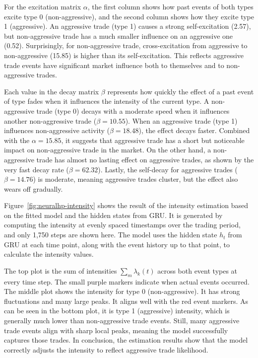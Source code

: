 For the excitation matrix $\alpha$, the first column shows how past events of both types excite type 0 (non-aggressive), and the second column shows how they excite type 1 (aggressive). An aggressive trade (type 1) causes a strong self-excitation (2.57), but non-aggressive trade has a much smaller influence on an aggressive one (0.52). Surprisingly, for non-aggressive trade, cross-excitation from aggressive to non-aggressive (15.85) is higher than its self-excitation. This reflects aggressive trade events have significant market influence both to themselves and to non-aggressive trades.

Each value in the decay matrix $\beta$ represents how quickly the effect of a past event of type fades when it influences the intensity of the current type. A non-aggressive trade (type 0) decays with a moderate speed when it influences another non-aggressive trade (\( \beta = 10.55 \)). When an aggressive trade (type 1) influences non-aggressive activity (\( \beta = 18.48 \)), the effect decays faster. Combined with the $\alpha = 15.85$, it suggests that aggressive trade has a short but noticeable impact on non-aggressive trade in the market. On the other hand, a non-aggressive trade has almost no lasting effect on aggressive trades, as shown by the very fast decay rate (\( \beta = 62.32 \)). Lastly, the self-decay for aggressive trades (\( \beta = 14.76 \)) is moderate, meaning aggressive trades cluster, but the effect also wears off gradually.


Figure~\ref{fig:neuralhp-intensity} shows the result of the intensity estimation based on the fitted model and the hidden states from GRU. It is generated by computing the intensity at evenly spaced timestamps over the trading period, and only 1,750 steps are shown here. The model uses the hidden state $h_t$ from GRU at each time point, along with the event history up to that point, to calculate the intensity values. 

The top plot is the sum of intensities $\sum_{m} \lambda_k(t)$ across both event types at every time step. The small purple markers indicate when actual events occurred. The middle plot shows the intensity for type 0 (non-aggressive). It has strong fluctuations and many large peaks. It aligns well with the red event markers. As can be seen in the bottom plot, it is type 1 (aggressive) intensity, which is generally much lower than non-aggressive trade events. Still, many aggressive trade events align with sharp local peaks, meaning the model successfully captures those trades. In conclusion, the estimation results show that the model correctly adjusts the intensity to reflect aggressive trade likelihood.

